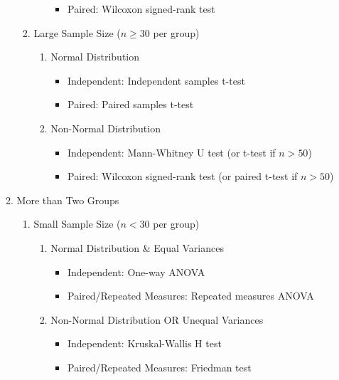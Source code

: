 \documentclass{article}
\begin{document}
\begin{enumerate}
\begin{enumerate}
\begin{enumerate}
\begin{enumerate}
\begin{itemize}
                    \item Paired: Wilcoxon signed-rank test
                \end{itemize}
            \end{enumerate}
            \item Large Sample Size ($n \geq 30$ per group)
            \begin{enumerate}
                \item Normal Distribution
                \begin{itemize}
                    \item Independent: Independent samples t-test
                    \item Paired: Paired samples t-test
                \end{itemize}
                \item Non-Normal Distribution
                \begin{itemize}
                    \item Independent: Mann-Whitney U test (or t-test if $n > 50$)
                    \item Paired: Wilcoxon signed-rank test (or paired t-test if $n > 50$)
                \end{itemize}
            \end{enumerate}
        \end{enumerate}
        \item More than Two Groups
        \begin{enumerate}
            \item Small Sample Size ($n < 30$ per group)
            \begin{enumerate}
                \item Normal Distribution \& Equal Variances
                \begin{itemize}
                    \item Independent: One-way ANOVA
                    \item Paired/Repeated Measures: Repeated measures ANOVA
                \end{itemize}
                \item Non-Normal Distribution OR Unequal Variances
                \begin{itemize}
                    \item Independent: Kruskal-Wallis H test
                    \item Paired/Repeated Measures: Friedman test
                \end{itemize}

\end{enumerate}
\end{enumerate}
\end{enumerate}
\end{enumerate}
\end{document}
